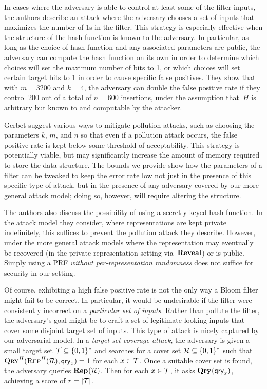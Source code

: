 In cases where the adversary is able to control at least some of the filter inputs,
the authors describe an attack where the adversary chooses a set of
inputs that maximizes the number of 1s in the filter. This strategy is especially
effective when the structure of the hash function is known to the adversary. In
particular, as long as the choice of hash function and any associated parameters
are public, the adversary can compute the hash function on its own in order to
determine which choices will set the maximum number of bits to 1, or which
choices will set certain target bits to 1 in order to cause specific false
positives. They show that with $m = 3200$ and $k = 4$, the adversary can double
the false positive rate if they control 200 out of a total of $n = 600$
insertions, under the assumption that~$H$ is arbitrary but known to and
computable by the attacker.

Gerbet \etal suggest various ways to mitigate pollution attacks, such as choosing
the parameters $k$, $m$, and $n$ so that even if a pollution attack
occurs, the false positive rate is kept below some threshold of acceptability.
This strategy is  potentially viable, but may significantly increase the amount
of memory required to store the data structure.  The bounds we provide show how
the parameters of a filter can be tweaked to keep the error rate low not just in
the presence of this specific type of attack, but in the presence of any
adversary covered by our more general attack model; doing so, however, will
require altering the structure.

The authors also discuss the possibility of using a secretly-keyed
hash function. In the attack model they consider, where representations are kept
private indefinitely, this suffices to prevent the pollution attack they
describe. However, under the more general attack models where the representation
may eventually be recovered (in the private-representation setting via~$\mathbf{Reveal}$)
or is public.  Simply using a PRF \emph{without per-representation randomness}
does not suffice for security in our setting.

%
Of course, exhibiting a high false positive rate is not the only way a Bloom
filter might fail to be correct. In particular, it would be undesirable if the
filter were consistently incorrect on a \emph{particular set of inputs}. Rather
than pollute the filter, the adversary's goal might be to craft a set of
legitimate looking inputs that cover some disjoint target set of inputs.
%
This type of attack is nicely captured by our adversarial model.
%
In a \emph{target-set coverage attack}, the adversary is given a small target set
$\mathcal{T}\subseteq\{0,1\}^*$ and searches for a cover set $\mathcal{R}\subseteq\{0,1\}^*$
such that $\textnormal{\textsc{Qry}}^H(\textnormal{\textsc{Rep}}^H(\mathcal{R}),\mathsf{qry}_x)=1$ for each $x\in\mathcal{T}$.
%
Once a suitable cover set is found, the adversary queries $\textup{\textbf{Rep}}\hspace{0.5pt}(\mathcal{R})$. Then
for each $x\in\mathcal{T}$, it asks $\textup{\textbf{Qry}}\hspace{0.5pt}(\mathsf{qry}_x)$, achieving a score of $r = |\mathcal{T}|$.

